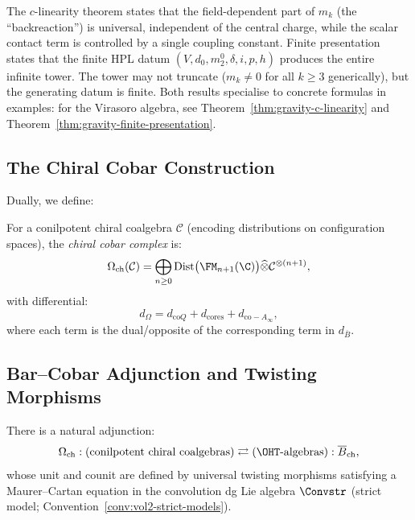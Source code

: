 \begin{remark}[Content]
\label{rem:c-linearity-content}
The $c$-linearity theorem states that the
field-dependent part of $m_k$ (the ``backreaction'') is
universal, independent of the central charge, while the
scalar contact term is controlled by a single coupling
constant. Finite presentation states that the finite HPL datum
$(V,d_0,m_2^0,\delta,i,p,h)$ produces the entire infinite tower.
The tower may not truncate ($m_k \ne 0$ for all $k \ge 3$
generically), but the generating datum is finite.
Both results specialise to concrete formulas in examples:
for the Virasoro algebra, see
Theorem~\ref{thm:gravity-c-linearity} and
Theorem~\ref{thm:gravity-finite-presentation}.
\end{remark}

\subsection{The Chiral Cobar Construction}
Dually, we define:

\begin{definition}
\label{def:chiral_cobar}
For a conilpotent chiral coalgebra $\mathcal{C}$ (encoding distributions on configuration spaces), the \emph{chiral cobar complex} is:
\begin{equation}
\Omega_{\text{ch}}(\mathcal{C}) = \bigoplus_{n \geq 0} \text{Dist}\big(\FM_{n+1}(\C)\big) \widehat{\otimes} \mathcal{C}^{\otimes (n+1)},
\end{equation}
with differential:
\begin{equation}
d_{\Omega} = d_{\text{co}Q} + d_{\text{cores}} + d_{\text{co}-A_\infty},
\end{equation}
where each term is the dual/opposite of the corresponding term in $d_{\overline{B}}$.
\end{definition}

\subsection{Bar--Cobar Adjunction and Twisting Morphisms}

\begin{theorem}
\label{thm:bar_cobar_adjunction}
There is a natural adjunction:
\begin{equation}
\Omega_{\text{ch}} : (\text{conilpotent chiral coalgebras}) \rightleftarrows (\OHT\text{-algebras}) : \overline{B}_{\text{ch}},
\end{equation}
whose unit and counit are defined by universal twisting morphisms satisfying a Maurer--Cartan equation in the convolution dg Lie algebra $\Convstr$ (strict model; Convention~\ref{conv:vol2-strict-models}).
\end{theorem}


